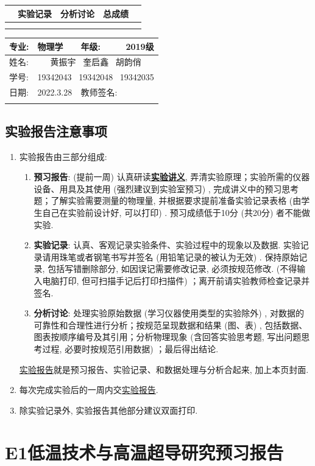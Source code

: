 \documentclass{ctexart}
\title{\experimentname}
\author{\stuID \student}
\date{\today}
\newcommand{\experimentname}{E1低温技术与高温超导研究}
\newcommand{\student}{黄振宇  \ 奎启鑫 \ 胡韵俏}
\newcommand{\Grade}{2019级}
\newcommand{\stuID}{19342043  \ 19342048 \ 19342035}
\newcommand{\previewdate}{2022.3.28}
\newcommand{\inlinemaketitle}{{\let\newpage\relax\maketitle}}
\theoremstyle{ansstyle}
\newcommand{\infotable}{%
	\begin{center}
		\begin{tabular}{|p{1.49cm}<{\centering}|p{1.49cm}<{\centering}|p{1.49cm}<{\centering}|p{1.49cm}<{\centering}|p{1.49cm}<{\centering}|p{1.49cm}<{\centering}|p{1.49cm}<{\centering}|p{1.49cm}<{\centering}|}
			\specialrule{0em}{0.3cm}{0cm}
			\hline
			\multicolumn{2}{|c|}{\LARGE 预习实验} & \multicolumn{2}{c|}{\LARGE 实验记录}& \multicolumn{2}{c|}{\LARGE 分析讨论} & \multicolumn{2}{c|}{\LARGE 总成绩} \\
			\hline
			&&&&&&& \\
			\hline
			\specialrule{0em}{0.3cm}{0cm}
		\end{tabular}
	\end{center}%
}
\newcommand{\previewdata}{%
	\begin{center}
		\begin{tabular}{|p{1.5cm}|p{4.5cm}|p{4cm}|p{3.65cm}|}
			\hline
			{\large 专业}:  & {\large 物理学}    & {\large 年级: }    & {\large \Grade} \\
			\hline
			{\large 姓名: } & \multicolumn{3}{c|}{\large \student} \\
			\hline
			{\large 学号: }  & \multicolumn{3}{c|}{\large \stuID} \\
			\hline
			{\large 日期: } & {\large \previewdate} & {\large 教师签名: } & \\
			\hline
			\specialrule{0em}{0.6cm}{0cm}
		\end{tabular}
	\end{center}%
}
\begin{document}
\noindent
\renewcommand\arraystretch{1.8}
\infotable

\renewcommand\arraystretch{1.3}
\previewdata

\inlinemaketitle
\tableofcontents

\subsection{实验报告注意事项}

\begin{enumerate}
    \item 实验报告由三部分组成:
          \begin{enumerate}
              \item \textbf{预习报告}:
                    (提前一周) 认真研读\underline{\textbf{实验讲义}}, 弄清实验原理；实验所需的仪器设备、用具及其使用 (强烈建议到实验室预习) , 完成讲义中的预习思考题；了解实验需要测量的物理量, 并根据要求提前准备实验记录表格 (由学生自己在实验前设计好, 可以打印) . 预习成绩低于10分 (共20分) 者不能做实验.
              \item \textbf{实验记录}:
                    认真、客观记录实验条件、实验过程中的现象以及数据. 实验记录请用珠笔或者钢笔书写并签名 ({\color{red}用铅笔记录的被认为无效}) . {\color{red}保持原始记录, 包括写错删除部分, 如因误记需要修改记录, 必须按规范修改. } (不得输入电脑打印, 但可扫描手记后打印扫描件) ；离开前请实验教师检查记录并签名.
              \item \textbf{分析讨论}:
                    处理实验原始数据 (学习仪器使用类型的实验除外) , 对数据的可靠性和合理性进行分析；按规范呈现数据和结果 (图、表) , 包括数据、图表按顺序编号及其引用；分析物理现象 (含回答实验思考题, 写出问题思考过程, 必要时按规范引用数据) ；最后得出结论.
          \end{enumerate}
          \underline{实验报告}就是预习报告、实验记录、和数据处理与分析合起来, 加上本页封面.
    \item 每次完成实验后的一周内交\underline{实验报告}.
    \item 除实验记录外, 实验报告其他部分建议双面打印.
\end{enumerate}


\section*{\experimentname 预习报告}
\end{document}
